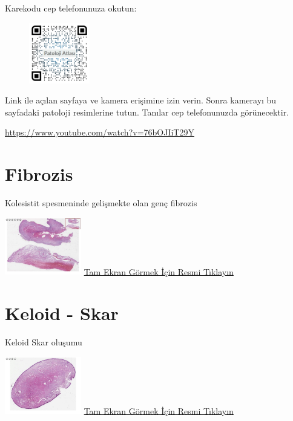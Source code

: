 \documentclass[
  letterpaper,
  paper=6in:9in,
  pagesize=pdftex,
  headinclude=on,
  footinclude=on,
  12pt]{scrbook}
\begin{document}
Karekodu cep telefonunuza okutun:

\begin{figure}[H]

\includegraphics[width=1.04167in,height=\textheight]{images/AR-tamir.jpeg} \hfill{}

\end{figure}

Link ile açılan sayfaya ve kamera erişimine izin verin. Sonra kamerayı
bu sayfadaki patoloji resimlerine tutun. Tanılar cep telefonunuzda
görünecektir.

\url{https://www.youtube.com/watch?v=76bOJIiT29Y}

\hypertarget{sec-fibrozis}{%
\section{Fibrozis}\label{sec-fibrozis}}

Kolesistit spesmeninde gelişmekte olan genç fibrozis

\href{https://images.patolojiatlasi.com/fibrosis/HE.html}{\includegraphics[width=0.25\textwidth,height=\textheight]{./screenshots/fibrosis_screenshot.png}}
\href{https://images.patolojiatlasi.com/fibrosis/HE.html}{Tam Ekran
Görmek İçin Resmi Tıklayın}

\hypertarget{sec-keloid-skar}{%
\section{Keloid - Skar}\label{sec-keloid-skar}}

Keloid Skar oluşumu

\href{https://images.patolojiatlasi.com/keloid-scar/HE.html}{\includegraphics[width=0.25\textwidth,height=\textheight]{./screenshots/keloid-scar_screenshot.png}}
\href{https://images.patolojiatlasi.com/keloid-scar/HE.html}{Tam Ekran
Görmek İçin Resmi Tıklayın}
\end{document}
